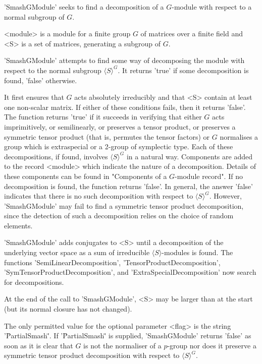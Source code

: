 'SmashGModule' seeks to find a decomposition of a $G$-module with respect
to a normal subgroup of $G$.

<module>  is a module for a  finite group $G$  of  matrices over a finite
field and <S> is a set of matrices, generating a subgroup of $G$.

'SmashGModule'  attempts to find some way  of decomposing the module with
respect to the normal subgroup $\langle S \rangle ^G$.  It returns 'true'
if some decomposition is found, 'false' otherwise.

It  first ensures that   $G$  acts absolutely  irreducibly  and that  <S>
contain at least one non-scalar  matrix.  If  either of these  conditions
fails,   then it  returns  'false'.   The function returns  'true'  if it
succeeds   in     verifying that either   $G$     acts  imprimitively, or
semilinearly, or preserves a   tensor product, or preserves  a  symmetric
tensor product (that is, permutes the tensor factors) or $G$ normalises a
group which is  extraspecial or a  2-group  of symplectic type.   Each of
these decompositions,  if  found, involves  $\langle S  \rangle  ^G$ in a
natural way.  Components are added to the  record <module> which indicate
the nature of a decomposition.  Details of these  components can be found
in  "Components of a $G$-module record".   If no  decomposition is found,
the function returns 'false'.   In general, the answer  'false' indicates
that there   is  no such  decomposition  with   respect   to  $\langle  S
\rangle^G$.  However, 'SmashGModule' may  fail to find a symmetric tensor
product decomposition, since the detection of such a decomposition relies
on the choice of random elements.

'SmashGModule' adds   conjugates  to <S>  until  a  decomposition  of the
underlying   vector   space    as   a  sum    of    irreducible  $\langle
S\rangle$-modules is   found.  The  functions  'SemiLinearDecomposition',
'TensorProductDecomposition',     'SymTensorProductDecomposition',    and
'ExtraSpecialDe\-composition' now search for decompositions.

At the end of the  call to 'SmashGModule', <S> may  be larger than at the
start (but its normal closure has not changed).

The only permitted value for the  optional parameter <flag> is the string
'\"PartialSmash\"'.   If  '\"PartialSmash\"' is supplied,  'SmashGModule'
returns 'false' as soon as it is clear that  $G$ is not the normaliser of
a $p$-group nor does it preserve a symmetric tensor product decomposition
with respect to $\langle S \rangle^G$.

